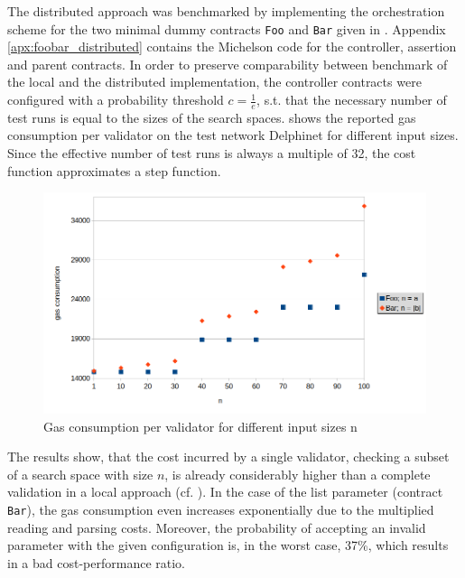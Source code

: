 The distributed approach was benchmarked by implementing the orchestration scheme for the two minimal dummy contracts \texttt{Foo} and \texttt{Bar} given in . Appendix \ref{apx:foobar_distributed} contains the Michelson code for the controller, assertion and parent contracts. In order to preserve comparability between benchmark of the local and the distributed implementation, the controller contracts were configured with a probability threshold $c = \frac{1}{e}$, s.t. that the necessary number of test runs is equal to the sizes of the search spaces.  shows the reported gas consumption per validator on the test network Delphinet for different input sizes. Since the effective number of test runs is always a multiple of 32, the cost function approximates a step function.  

\begin{figure}[t]
\centering
\includegraphics[width=\linewidth]{figures/5-offline_tezos/cost_analysis}
\caption{Gas consumption per validator for different input sizes n}
\label{fig:cost_distributed}
\end{figure}

The results show, that the cost incurred by a single validator, checking a subset of a search space with size $n$, is already considerably higher than a complete validation in a local approach (cf. ). In the case of the list parameter (contract \texttt{Bar}), the gas consumption even increases exponentially due to the multiplied reading and parsing costs. Moreover, the probability of accepting an invalid parameter with the given configuration is, in the worst case, 37\%, which results in a bad cost-performance ratio.

